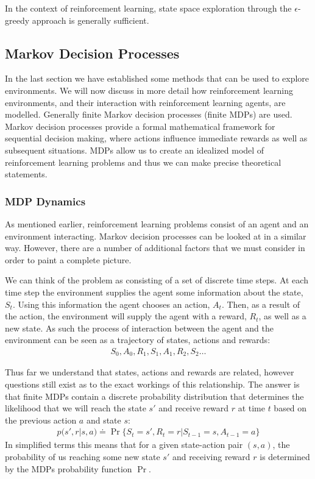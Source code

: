 In the context of reinforcement learning, state space exploration through the $\epsilon$-greedy approach is
generally sufficient.

\subsection{Markov Decision Processes}\label{subsec:mdp}
In the last section we have established some methods that can be used to explore environments.
We will now discuss in more detail how reinforcement learning environments, and their interaction
with reinforcement learning agents, are modelled.
Generally finite Markov decision processes (finite MDPs) are used.
Markov decision processes provide a formal mathematical framework for sequential decision making,
where actions influence immediate rewards as well as subsequent situations\citep{sutton1998reinforcement}.
MDPs allow us to create an idealized model of reinforcement learning problems and thus we can make precise
theoretical statements.

\subsubsection{MDP Dynamics}

As mentioned earlier, reinforcement learning problems consist of an agent and an environment interacting.
Markov decision processes can be looked at in a similar way.
However, there are a number of additional factors that we must consider in order to paint a complete picture.

We can think of the problem as consisting of a set of discrete time steps.
At each time step the environment supplies the agent some information about the state, $S_t$.
Using this information the agent chooses an action, $A_t$.
Then, as a result of the action, the environment will supply the agent with a reward, $R_t$, as well as a new state.
As such the process of interaction between the agent and the environment can be seen as a trajectory of states,
actions and rewards\citep{sutton1998reinforcement}:
\begin{align}
    S_0,A_0,R_1,S_1,A_1,R_2,S_2\dots
\end{align}

Thus far we understand that states, actions and rewards are related, however questions still exist as to
the exact workings of this relationship.
The answer is that finite MDPs contain a discrete probability distribution that determines the likelihood that we
will reach the state $s'$ and receive reward $r$ at time $t$ based on the previous action $a$ and state $s$:
\begin{align}
    p(s',r|s,a) \doteq \Pr\{S_t=s',R_t=r|S_{t-1}=s,A_{t-1}=a\}
\end{align}
In simplified terms this means that for a given state-action pair $(s,a)$, the probability of us reaching some
new state $s'$ and receiving reward $r$ is determined by the MDPs probability function $\Pr$.

